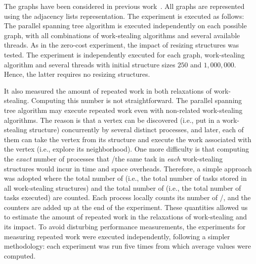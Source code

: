 The graphs have been considered in previous work~\cite{1302951, maged.vechev.2009, fencefreework}.  All graphs are represented using the adjacency lists representation. The experiment is executed as follows: The parallel spanning tree algorithm is executed independently on each possible graph, with all combinations of work-stealing algorithms and several available threads.  As in the zero-cost experiment, the impact of resizing structures was tested. The experiment is independently executed for each graph, work-stealing algorithm and several threads with initial structure sizes $250$ and $1,000,000$. Hence, the latter requires no resizing structures.

It also measured the amount of repeated work in both relaxations of work-stealing.  Computing this number is not straightforward.  The parallel spanning tree algorithm may execute repeated work even with non-related work-stealing algorithms. The reason is that a vertex can be discovered (i.e., put in a work-stealing structure) concurrently by several distinct processes, and later, each of them can take the vertex from its structure and execute the work associated with the vertex (i.e., explore its neighborhood).  One more difficulty is that computing the \emph{exact} number of processes that \Take/\Steal the same task in \emph{each} work-stealing structures would incur in time and space overheads.  Therefore, a simple approach was adopted where the total number of \Puts (i.e., the total number of tasks stored in all work-stealing structures) and the total number of \Takes (i.e., the total number of tasks executed) are counted.  Each process locally counts its number of \Puts/\Takes, and the counters are added up at the end of the experiment.  These quantities allowed us to estimate the amount of repeated work in the relaxations of work-stealing and its impact.  To avoid disturbing performance measurements, the experiments for measuring repeated work were executed independently, following a simpler methodology: each experiment was run five times from which average values were computed.

